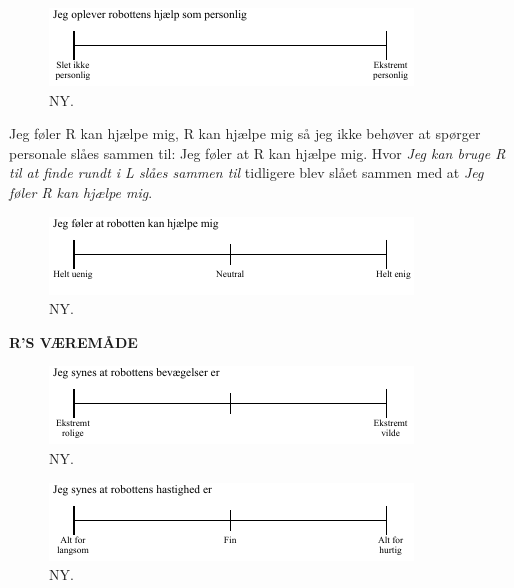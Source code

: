 %
\begin{figure}[H]
\centering
\includegraphics[width =\textwidth]{Figure/UdvalgteSkalaer/PersonligHjaelp} 
\caption{NY.}
\label{fig:SkalaPersonligHjaelp}
\end{figure}
\noindent
%
Jeg føler R kan hjælpe mig, R kan hjælpe mig så jeg ikke behøver at spørger personale slåes sammen til: Jeg føler at R kan hjælpe mig. Hvor \textit{ Jeg kan bruge R til at finde rundt i L slåes sammen til} tidligere blev slået sammen med at \textit{Jeg føler R kan hjælpe mig}.
%
\begin{figure}[H]
\centering
\includegraphics[width =\textwidth]{Figure/UdvalgteSkalaer/RobottenKanHjaelpe} 
\caption{NY.}
\label{fig:SkalaRKanHjaelpe}
\end{figure}
\noindent
%
\textbf{R'S VÆREMÅDE}\\
%
\begin{figure}[H]
\centering
\includegraphics[width =\textwidth]{Figure/UdvalgteSkalaer/BevaegelserR} 
\caption{NY.}
\label{fig:SkalaBevaegelserR}
\end{figure}
\noindent
%
%
\begin{figure}[H]
\centering
\includegraphics[width =\textwidth]{Figure/UdvalgteSkalaer/HastighedR} 
\caption{NY.}
\label{fig:SkalaHastighedR}
\end{figure}
